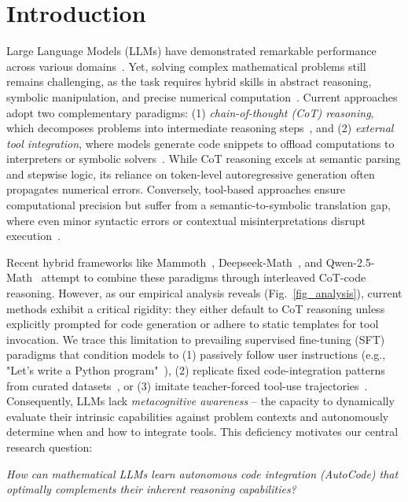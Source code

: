 
\section{Introduction}\label{sec1}

Large Language Models (LLMs) have demonstrated remarkable performance across various domains~\citep{app, gpt4, llama3, gemini, yang2024qwen2}. Yet, solving complex mathematical problems still remains challenging, as the task requires hybrid skills in abstract reasoning, symbolic manipulation, and precise numerical computation~\citep{pal, mammoth, tora, htl}. 
Current approaches adopt two complementary paradigms: (1) \emph{chain-of-thought (CoT) reasoning}, which decomposes problems into intermediate reasoning steps~\citep{cot, metamath}, and (2) \emph{external tool integration}, where models generate code snippets to offload computations to interpreters or symbolic solvers~\citep{openmath, mammoth}. While CoT reasoning excels at semantic parsing and stepwise logic, its reliance on token-level autoregressive generation often propagates numerical errors. Conversely, tool-based approaches ensure computational precision but suffer from a semantic-to-symbolic translation gap, where even minor syntactic errors or contextual misinterpretations disrupt execution~\citep{htl}.


Recent hybrid frameworks like Mammoth~\citep{mammoth}, Deepseek-Math~\citep{tora, dsmath}, and Qwen-2.5-Math~\citep{qwen25} attempt to combine these paradigms through interleaved CoT-code reasoning. However, as our empirical analysis reveals (Fig.~\ref{fig_analysis}), current methods exhibit a critical rigidity: they either default to CoT reasoning unless explicitly prompted for code generation or adhere to static templates for tool invocation.  We trace this limitation to prevailing supervised fine-tuning (SFT) paradigms that condition models to (1) passively follow user instructions (e.g., "Let’s write a Python program"~\citep{mammoth}), (2) replicate fixed code-integration patterns from curated datasets~\citep{qwen25}, or (3) imitate teacher-forced tool-use trajectories~\citep{tora, dsmath}.  Consequently, LLMs lack \emph{metacognitive awareness} -- the capacity to dynamically evaluate their intrinsic capabilities against problem contexts and autonomously determine when and how to integrate tools. This deficiency motivates our central research question:

\vspace{0.1in}
\emph{How can mathematical LLMs learn autonomous code integration (AutoCode) that optimally complements their inherent reasoning capabilities?}
\vspace{0.1in}

